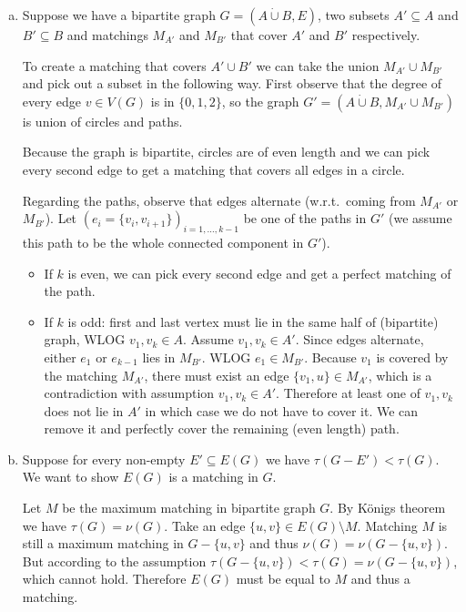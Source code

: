 \begin{exercise}{2}
    \begin{enumerate}[a)]
        \item{} Suppose we have a bipartite graph $G = (A \dot\cup B, E)$, two
            subsets $A' \subseteq A$ and $B' \subseteq B$ and matchings $M_{A'}$
            and $M_{B'}$ that cover $A'$ and $B'$ respectively.

            To create a matching that covers $A' \cup B'$ we can take the union
            $M_{A'} \cup M_{B'}$ and pick out a subset in the following way.
            First observe that the degree of every edge $v \in V(G)$ is in $\{0,
            1, 2\}$, so the graph $G' = (A \dot\cup B, M_{A'} \cup M_{B'})$ is
            union of circles and paths.

            Because the graph is bipartite, circles are of even length and we
            can pick every second edge to get a matching that covers all edges
            in a circle.

            Regarding the paths, observe that edges alternate (w.r.t.\ coming
            from $M_{A'}$ or $M_{B'}$). Let $(e_i = \{v_i, v_{i+1}\})_{i = 1,
            \dots, k-1}$ be one of the paths in $G'$ (we assume this path to be
            the whole connected component in $G'$).
            \begin{itemize}
                \item{} If $k$ is even, we can pick every second edge and get a
                    perfect matching of the path.
                \item{} If $k$ is odd: first and last vertex must lie in the
                    same half of (bipartite) graph, WLOG $v_1, v_k \in A$.
                    Assume $v_1, v_k \in A'$. Since edges alternate, either
                    $e_1$ or $e_{k-1}$ lies in $M_{B'}$. WLOG $e_1 \in M_{B'}$.
                    Because $v_1$ is covered by the matching $M_{A'}$, there
                    must exist an edge $\{v_1, u\} \in M_{A'}$, which is a
                    contradiction with assumption $v_1, v_k \in A'$. Therefore
                    at least one of $v_1, v_k$ does not lie in $A'$ in which
                    case we do not have to cover it. We can remove it and
                    perfectly cover the remaining (even length) path.
            \end{itemize}

        \item{} Suppose for every non-empty $E' \subseteq E(G)$ we have $\tau(G -
            E') < \tau(G)$. We want to show $E(G)$ is a matching in $G$.

            Let $M$ be the maximum matching in bipartite graph $G$. By Königs
            theorem we have $\tau(G) = \nu(G)$. Take an edge $\{u, v\} \in E(G)
            \setminus M$. Matching $M$ is still a maximum matching in $G - \{u,
            v\}$ and thus $\nu(G) = \nu(G - \{u, v\})$. But according to the
            assumption $\tau(G - \{u, v\}) < \tau(G) = \nu(G - \{u, v\})$, which
            cannot hold. Therefore $E(G)$ must be equal to $M$ and thus a
            matching.
    \end{enumerate}
\end{exercise}


